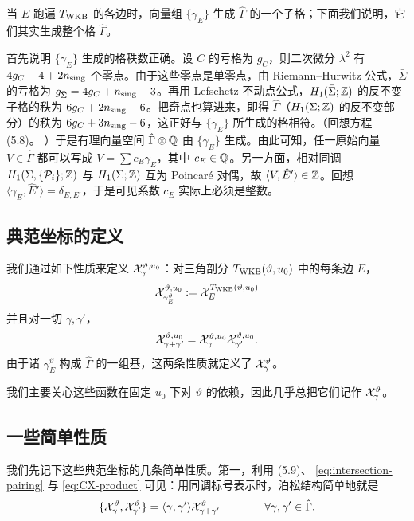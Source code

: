 当 $E$ 跑遍 $T_{\rm WKB}$ 的各边时，向量组 $\{\gamma_E\}$ 生成 $\hat\Gamma$ 的一个子格；下面我们说明，它们其实生成整个格 $\hat\Gamma$。

首先说明 $\{\gamma_E\}$ 生成的格秩数正确。设 $C$ 的亏格为 $g_C$，则二次微分 $\lambda^2$ 有 $4g_C-4+2n_{\rm sing}$ 个零点。由于这些零点是单零点，由 Riemann–Hurwitz 公式，$\bar\Sigma$ 的亏格为 $g_{\bar\Sigma}=4g_C+n_{\rm sing}-3$。再用 Lefschetz 不动点公式，$H_1(\bar\Sigma;\mathbb{Z})$ 的反不变子格的秩为 $6g_C+2n_{\rm sing}-6$。把奇点也算进来，即得 $\hat\Gamma$（$H_1(\Sigma;\mathbb{Z})$ 的反不变部分）的秩为 $6g_C+3n_{\rm sing}-6$，这正好与 $\{\gamma_E\}$ 所生成的格相符。（回想方程 (5.8)。%
）于是有理向量空间 $\hat\Gamma\otimes\mathbb{Q}$ 由 $\{\gamma_E\}$ 生成。由此可知，任一原始向量 $V\in\hat\Gamma$ 都可以写成 $V=\sum c_E\gamma_E$，其中 $c_E\in\mathbb{Q}$。另一方面，相对同调 $H_1(\Sigma,\{\mathcal{P}_i\};\mathbb{Z})$ 与 $H_1(\Sigma;\mathbb{Z})$ 互为 Poincaré 对偶，故 $\langle V,\hat E'\rangle\in\mathbb{Z}$。回想 $\langle\gamma_E,\hat E'\rangle=\delta_{E,E'}$，于是可见系数 $c_E$ 实际上必须是整数。

\subsection{典范坐标的定义}

我们通过如下性质来定义 $\mathcal{X}^{\vartheta,u_0}_\gamma$：对三角剖分 $T_{\rm WKB}(\vartheta,u_0)$ 中的每条边 $E$，
\begin{equation} \label{eq:canonical-darboux}
\mathcal{X}^{\vartheta,u_0}_{\gamma^\vartheta_E} :=
\mathcal{X}^{T_{\rm WKB}(\vartheta,u_0)}_E
\end{equation}
并且对一切 $\gamma,\gamma'$，
\begin{equation} \label{eq:CX-product}
\mathcal{X}^{\vartheta,u_0}_{\gamma + \gamma'} = \mathcal{X}^{\vartheta,u_0}_\gamma
\mathcal{X}^{\vartheta,u_0}_{\gamma'}.
\end{equation}
由于诸 $\gamma^\vartheta_E$ 构成 $\hat\Gamma$ 的一组基，这两条性质就定义了 $\mathcal{X}^\vartheta_\gamma$。

我们主要关心这些函数在固定 $u_0$ 下对 $\vartheta$ 的依赖，因此几乎总把它们记作 $\mathcal{X}^\vartheta_\gamma$。

\subsection{一些简单性质}

我们先记下这些典范坐标的几条简单性质。第一，利用 (5.9)、%
\eqref{eq:intersection-pairing} 与 \eqref{eq:CX-product} 可见：用同调标号表示时，泊松结构简单地就是
\begin{equation} \label{eq:homology-poisson}
\{ \mathcal{X}^\vartheta_\gamma, \mathcal{X}^\vartheta_{\gamma'} \} = \langle \gamma, \gamma' \rangle
\mathcal{X}^\vartheta_{\gamma + \gamma'} \qquad\qquad \forall \gamma, \gamma' \in
\hat\Gamma.
\end{equation}

